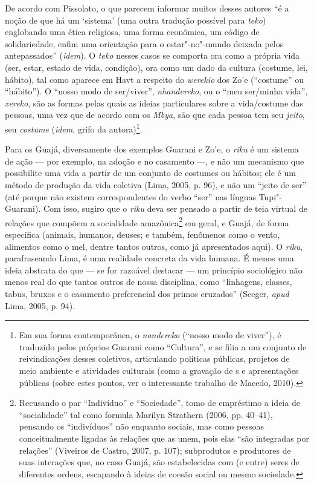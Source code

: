 De acordo com Pissolato, o que parecem informar muitos desses autores ``é
a noção de que há um `sistema' (uma outra tradução possível para
\emph{teko}) englobando uma ética religiosa, uma forma econômica, um
código de solidariedade, enfim uma orientação para o estar"-no"-mundo
deixada pelos antepassados'' (\emph{idem}). O \emph{teko} nesses casos se
comporta ora como a própria vida (ser, estar, estado de vida, condição),
ora como um dado da cultura (costume, lei, hábito), tal como aparece em
Havt a respeito do \emph{werekio} dos Zo'e (``costume'' ou ``hábito''). O
``nosso modo de ser/viver'', \emph{nhandereko}, ou o ``meu ser/minha vida'',
\emph{xereko}, são as formas pelas quais as ideias particulares sobre a
vida/costume das pessoas, uma vez que de acordo com os \emph{Mbya}, são
que cada pessoa tem seu \emph{jeito}, seu \emph{costume} (\emph{idem}, grifo da
autora)\footnote{Em sua forma contemporânea, o \emph{nandereko} (``nosso
  modo de viver''), é traduzido pelos próprios Guarani como ``Cultura'', e
  se filia a um conjunto de reivindicações desses coletivos, articulando
  políticas públicas, projetos de meio ambiente e atividades culturais
  (como a gravação de s e apresentações públicas (sobre estes pontos,
  ver o interessante trabalho de Macedo, 2010).}.

Para os Guajá, diversamente dos exemplos Guarani e Zo'e, o \emph{riku} é
um sistema de ação --- por exemplo, na adoção e no casamento ---, e não um
mecanismo que possibilite uma vida a partir de um conjunto de costumes
ou hábitos; ele é um método de produção da vida coletiva (Lima, 2005,
p. 96), e não um ``jeito de ser'' (até porque não existem correspondentes
do verbo ``ser'' nas línguas Tupi"-Guarani). Com isso, sugiro que o
\emph{riku} deva ser pensado a partir de teia virtual de relações que
compõem a socialidade amazônica\footnote{Recusando o par ``Indivíduo'' e
  ``Sociedade'', tomo de empréstimo a ideia de ``socialidade'' tal como
  formula Marilyn Strathern (2006, pp. 40--41), pensando os ``indivíduos''
  não enquanto sociais, mas como pessoas conceitualmente ligadas às
  relações que as unem, pois elas ``são integradas por relações''
  (Viveiros de Castro, 2007, p. 107); subprodutos e produtores de suas
  interações que, no caso Guajá, são estabelecidas com (e entre) seres
  de diferentes ordens, escapando à ideias de coesão social ou mesmo
  sociedade.} em geral, e Guajá, de forma específica (animais, humanos,
deuses; e também, fenômenos como o vento, alimentos como o mel, dentre
tantos outros, como já apresentados aqui). O \emph{riku}, parafraseando
Lima, é uma realidade concreta da vida humana. É menos uma ideia
abstrata do que --- se for razoável destacar --- um princípio sociológico
não menos real do que tantos outros de nossa disciplina, como
``linhagens, classes, tabus, bruxos e o casamento preferencial dos primos
cruzados'' (Seeger, \emph{apud} Lima, 2005, p. 94).

